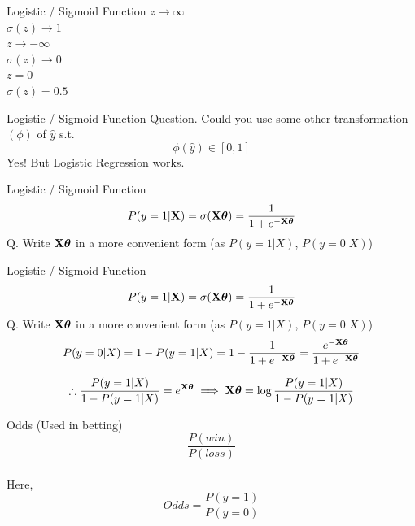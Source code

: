 \documentclass{beamer}
\begin{document}
\begin{frame}{Logistic / Sigmoid Function}
 $z \rightarrow \infty$\\
\pause  $\sigma(z) \rightarrow 1$\\
\pause $z \rightarrow -\infty$\\
 \pause $\sigma(z) \rightarrow 0$\\
 \pause $z = 0$\\
 \pause $\sigma(z) = 0.5$

\end{frame}

\begin{frame}{Logistic / Sigmoid Function}
Question. Could you use some other transformation $(\phi)$ of $\hat{y}$ s.t. \\
\begin{equation*}
\phi(\hat{y}) \in [0, 1]
\end{equation*}
Yes! But Logistic Regression works.
\end{frame}
\begin{frame}{Logistic / Sigmoid Function}
\begin{equation*}
P(y = 1 | \mathbf{X}) = \sigma(\mathbf{X}\boldsymbol{\theta}) = \frac{1}{1 + e^{-\mathbf{X}\boldsymbol{\theta}}}    
\end{equation*}
Q. Write $\mathbf{X}\boldsymbol{\theta}$ in a more convenient form (as $P(y = 1|X)$, $P(y = 0 | X)$)\\
\end{frame}
\begin{frame}{Logistic / Sigmoid Function}
\begin{equation*}
P(y = 1 | \mathbf{X}) = \sigma(\mathbf{X}\boldsymbol{\theta}) = \frac{1}{1 + e^{-\mathbf{X}\boldsymbol{\theta}}}    
\end{equation*}
Q. Write $\mathbf{X}\boldsymbol{\theta}$ in a more convenient form (as $P(y = 1|X)$, $P(y = 0 | X)$)\\
\pause \begin{equation*}
P(y = 0 | X) = 1 - P(y = 1 | X) = 1 - \frac{1}{1 + e^{-\mathbf{X}\boldsymbol{\theta}}} = \frac{e^{-\mathbf{X}\boldsymbol{\theta}}}{1 + e^{-\mathbf{X}\boldsymbol{\theta}}} 
\end{equation*}

\pause \begin{equation*}
\therefore \frac{P(y = 1|X)}{1 - P(y = 1|X)} = e^{\mathbf{X}\boldsymbol{\theta}}
\implies \mathbf{X}\boldsymbol{\theta} = \log\frac{P(y = 1|X)}{1 - P(y = 1 | X)}
\end{equation*}
\end{frame}
\begin{frame}{Odds (Used in betting)}
$$\frac{P(win)}{P(loss)}$$ \\
\hspace{3cm} Here,\\
$$Odds = \frac{P(y = 1)}{P(y = 0)}$$ \\
\centering
{}
\end{frame}
\end{document}
